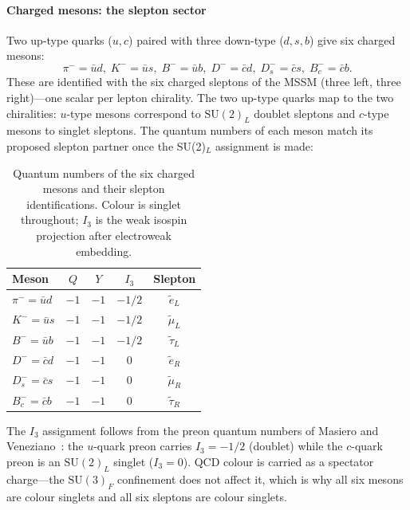 \documentclass[aps,prd,twocolumn,showpacs,preprintnumbers,superscriptaddress]{revtex4-2}
\newcommand{\SU}{\mathrm{SU}}
\begin{document}
\paragraph{Charged mesons: the slepton sector}

Two up-type quarks ($u, c$) paired with three down-type
($d, s, b$) give six charged mesons:
\begin{equation}
  \pi^- = \bar u d,\; K^- = \bar u s,\; B^- = \bar u b,\;
  D^- = \bar c d,\; D_s^- = \bar c s,\; B_c^- = \bar c b.
  \label{eq:6mesons}
\end{equation}
These are identified with the six charged sleptons of the MSSM
(three left, three right)---one scalar per lepton chirality.
The two up-type quarks map to the two chiralities:
$u$-type mesons correspond to $\SU(2)_L$ doublet sleptons
and $c$-type mesons to singlet sleptons.
The quantum numbers of each meson match its proposed
slepton partner once the SU(2)$_L$ assignment is made:

\begin{table}[h]
\centering
\caption{Quantum numbers of the six charged mesons and
  their slepton identifications.  Colour is singlet
  throughout; $I_3$ is the weak isospin projection after
  electroweak embedding.}
\label{tab:QN}
\begin{tabular}{lcccc}
\toprule
Meson & $Q$ & $Y$ & $I_3$ & Slepton \\
\midrule
$\pi^-=\bar ud$ & $-1$ & $-1$ & $-1/2$ & $\tilde e_L$ \\
$K^-=\bar us$ & $-1$ & $-1$ & $-1/2$ & $\tilde\mu_L$ \\
$B^-=\bar ub$ & $-1$ & $-1$ & $-1/2$ & $\tilde\tau_L$ \\
$D^-=\bar cd$ & $-1$ & $-1$ & $0$ & $\tilde e_R$ \\
$D_s^-=\bar cs$ & $-1$ & $-1$ & $0$ & $\tilde\mu_R$ \\
$B_c^-=\bar cb$ & $-1$ & $-1$ & $0$ & $\tilde\tau_R$ \\
\bottomrule
\end{tabular}
\end{table}

The $I_3$ assignment follows from the preon quantum numbers
of Masiero and Veneziano~\cite{MasieroVeneziano:1985}:
the $u$-quark preon carries $I_3 = -1/2$ (doublet) while
the $c$-quark preon is an $\SU(2)_L$ singlet ($I_3 = 0$).
QCD colour is carried as a spectator charge---the
$\SU(3)_F$ confinement does not affect it, which is why
all six mesons are colour singlets and all six sleptons
are colour singlets.
\end{document}

